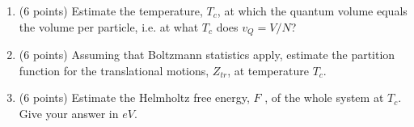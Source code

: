 \documentclass[fleqn]{article}
\begin{document}
\begin{enumerate}
    \item (6 points) Estimate the temperature, $T_c$, at which the quantum volume equals the volume per
    particle, i.e. at what $T_c$ does $v_Q=V/N$?


    \item (6 points) Assuming that Boltzmann statistics apply, estimate the partition function for the
    translational motions, $Z_{tr}$, at temperature $T_c$.
  

    \item (6 points) Estimate the Helmholtz free energy, $F$ , of the whole system at $T_c$. Give your answer
    in $eV$.


  \end{enumerate}
\end{document}

